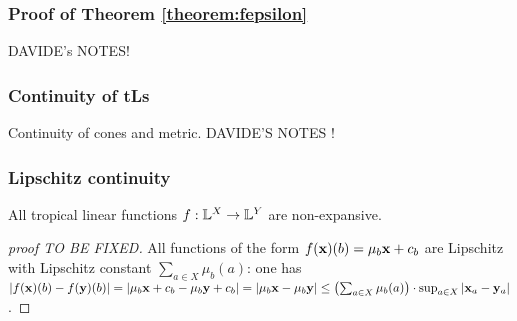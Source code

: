 \subsubsection{Proof of Theorem \ref{theorem:fepsilon}}




DAVIDE's NOTES!


\subsubsection{Continuity of tLs}




Continuity of cones and metric. DAVIDE'S NOTES
!






\subsubsection{Lipschitz continuity}







\begin{proposition}\label{prop:troplinear}
All tropical linear functions $f: \mathbb{L}^{X}\to \mathbb{L}^{Y}$ are non-expansive.  
\end{proposition}
\begin{proof}[proof TO BE FIXED]
All functions of the form $f(\mathbf{x})(b)= \mu_{b} \mathbf{x} + c_{b}$ are Lipschitz with Lipschitz constant
$\sum_{a\in X}\mu_{b}(a)$: 
one has $| f(\mathbf{x})(b)- f(\mathbf{y})(b) |= |\mu_{b}\mathbf{x}+c_{b} -\mu_{b}\mathbf{y}+c_{b}|=
|\mu_{b}\mathbf{x} -\mu_{b} \mathbf{y}  |\leq \left(\sum_{a\in X}\mu_{b}(a)\right)\cdot \sup_{a\in X}|\mathbf{x}_{a}-\mathbf{y}_{a}|$.

\end{proof}






